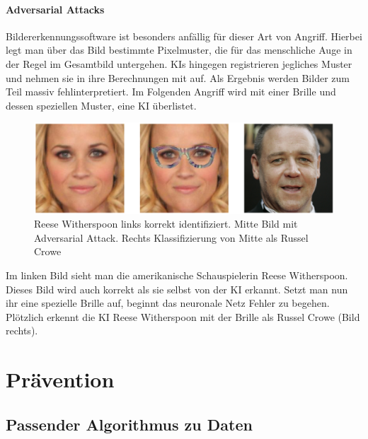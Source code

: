 \documentclass[12pt,oneside,a4paper,parskip]{scrbook}
\begin{document}
\subsubsection{Adversarial Attacks}
Bildererkennungssoftware ist besonders anfällig für dieser Art von Angriff. Hierbei legt man über das Bild bestimmte Pixelmuster, die für das menschliche Auge in der Regel im Gesamtbild untergehen. KIs hingegen registrieren jegliches Muster und nehmen sie in ihre Berechnungen mit auf. Als Ergebnis werden Bilder zum Teil massiv fehlinterpretiert. 
Im Folgenden Angriff wird mit einer Brille und dessen speziellen Muster, eine KI überlistet.
\label{section:BrilleAttack}
\begin{figure}[h]
	\begin{center}
		\includegraphics[width=15cm]{Bilder/Brille_Adversarial_Attack.png}
		\caption{Reese Witherspoon links korrekt identifiziert. Mitte Bild mit Adversarial Attack. Rechts Klassifizierung von Mitte als Russel Crowe}
		\label{fig:BrilleAttack}
	\end{center}
\end{figure}
Im linken Bild sieht man die amerikanische Schauspielerin Reese Witherspoon. Dieses Bild wird auch korrekt als sie selbst von der KI erkannt. Setzt man nun ihr eine spezielle Brille auf, beginnt das neuronale Netz Fehler zu begehen. Plötzlich erkennt die KI Reese Witherspoon mit der Brille als Russel Crowe (Bild rechts).

\chapter{Prävention}
\label{chapter:main}
\section{Passender Algorithmus zu Daten}
\end{document}

